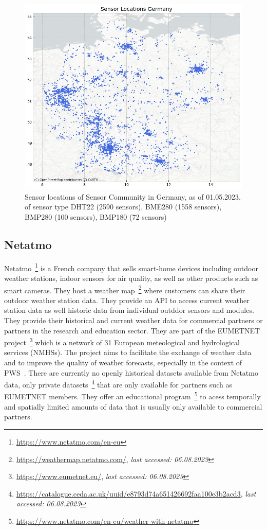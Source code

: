 \begin{figure}[ht]
    \centering
    \includegraphics[width=1\textwidth]{images/sc_sensor_locations_germany.png}
    \caption{Sensor locations of Sensor Community in Germany, as of 01.05.2023, of sensor type DHT22 (2590 sensors), BME280 (1558 sensors), BMP280 (100 sensors), BMP180 (72 sensors)}
    \label{fig:sensor community sensor locations germany}
\end{figure}

\subsection{Netatmo}

Netatmo~\footnote{\url{https://www.netatmo.com/en-eu}} is a French company that sells smart-home devices including outdoor weather stations, indoor sensors for air quality, as well as other products such as smart cameras. They host a weather map~\footnote{\url{https://weathermap.netatmo.com/}, \textit{last accessed: 06.08.2023}} where customers can share their outdoor weather station data. They provide an API to access current weather station data as well historic data from individual outddor sensors and modules.
They provide their historical and current weather data for commercial partners or partners in the research and education sector. They are part of the EUMETNET project~\footnote{\url{https://www.eumetnet.eu/}, \textit{last accessed: 06.08.2023}} which is a network of 31 European meteological and hydrological services (NMHSs). The project aims to facilitate the exchange of weather data and to improve the quality of weather forecasts, especially in the context of PWS~\cite{hahn2022observations}. There are currently no openly historical datasets available from Netatmo data, only private datasets~\footnote{\url{https://catalogue.ceda.ac.uk/uuid/e8793d74a651426692faa100e3b2acd3}, \textit{last accessed: 06.08.2023}} that are only available for partners such as EUMETNET members. They offer an educational program~\footnote{\url{https://www.netatmo.com/en-eu/weather-with-netatmo}} to acess temporally and spatially limited amounts of data that is usually only available to commercial partners.

